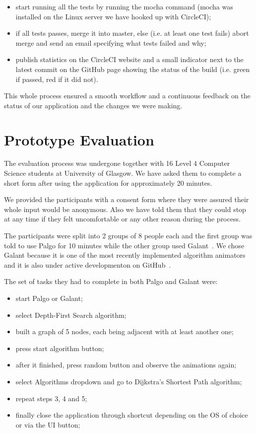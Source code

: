 \documentclass{l4proj}
\begin{document}
\begin{itemize}
  \item start running all the tests by running the mocha command (mocha was installed on the Linux server we have hooked
    up with CircleCI);
    \item if all tests passes, merge it into master, else (i.e. at least one test fails) abort merge and send an email specifying what tests failed and why;
  \item publish statistics on the CircleCI website and a small indicator next to the latest commit on the GitHub page
    showing the status of the build
    (i.e. green if passed, red if it did not).
\end{itemize}

This whole process ensured a smooth workflow and a continuous feedback on the status of our application and the
changes we were making.

\section{Prototype Evaluation}

The evaluation process was undergone together with 16 Level 4 Computer Science students at University of Glasgow. We
have asked them to complete a short form after using the application for approximately 20 minutes.

We provided the participants with a consent form where they were assured their whole input would be anonymous.
Also we have told them that they could stop at any time if they felt uncomfortable or any other reason during the
process.

The participants were split into 2 groups of 8 people each and the first group was told to use Palgo for 10 minutes while the
other group used Galant~\cite{galant}. We chose Galant because it is one of the most recently implemented algorithm
animators and it is also under active developmenton on GitHub~\cite{galant-github}.

The set of tasks they had to complete in both Palgo and Galant were:

\begin{itemize}
  \item start Palgo or Galant;
  \item select Depth-First Search algorithm;
  \item built a graph of 5 nodes, each being adjacent with at least another one;
  \item press start algorithm button;
  \item after it finished, press random button and observe the animations again;
  \item select Algorithms dropdown and go to Dijkstra's Shortest Path algorithm;
  \item repeat steps 3, 4 and 5;
  \item finally close the application through shortcut depending on the OS of choice or via the UI button;
\end{itemize}
\end{document}
